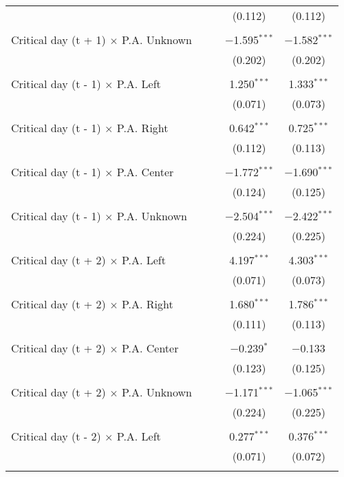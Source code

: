 \documentclass[
]{article}
\begin{document}
\begin{table}[!htbp]
{\begin{tabular}{@{\extracolsep{5pt}}lcccc}
  &  &  & (0.112) & (0.112) \\ 
  & & & & \\ 
 Critical day (t + 1) $\times$ P.A. Unknown &  &  & $-$1.595$^{***}$ & $-$1.582$^{***}$ \\ 
  &  &  & (0.202) & (0.202) \\ 
  & & & & \\ 
 Critical day (t - 1) $\times$ P.A. Left &  &  & 1.250$^{***}$ & 1.333$^{***}$ \\ 
  &  &  & (0.071) & (0.073) \\ 
  & & & & \\ 
 Critical day (t - 1) $\times$ P.A. Right &  &  & 0.642$^{***}$ & 0.725$^{***}$ \\ 
  &  &  & (0.112) & (0.113) \\ 
  & & & & \\ 
 Critical day (t - 1) $\times$ P.A. Center &  &  & $-$1.772$^{***}$ & $-$1.690$^{***}$ \\ 
  &  &  & (0.124) & (0.125) \\ 
  & & & & \\ 
 Critical day (t - 1) $\times$ P.A. Unknown &  &  & $-$2.504$^{***}$ & $-$2.422$^{***}$ \\ 
  &  &  & (0.224) & (0.225) \\ 
  & & & & \\ 
 Critical day (t + 2) $\times$ P.A. Left &  &  & 4.197$^{***}$ & 4.303$^{***}$ \\ 
  &  &  & (0.071) & (0.073) \\ 
  & & & & \\ 
 Critical day (t + 2) $\times$ P.A. Right &  &  & 1.680$^{***}$ & 1.786$^{***}$ \\ 
  &  &  & (0.111) & (0.113) \\ 
  & & & & \\ 
 Critical day (t + 2) $\times$ P.A. Center &  &  & $-$0.239$^{*}$ & $-$0.133 \\ 
  &  &  & (0.123) & (0.125) \\ 
  & & & & \\ 
 Critical day (t + 2) $\times$ P.A. Unknown &  &  & $-$1.171$^{***}$ & $-$1.065$^{***}$ \\ 
  &  &  & (0.224) & (0.225) \\ 
  & & & & \\ 
 Critical day (t - 2) $\times$ P.A. Left &  &  & 0.277$^{***}$ & 0.376$^{***}$ \\ 
  &  &  & (0.071) & (0.072) \\ 
  & & & & \\ 

\end{tabular}}
\end{table}
\end{document}
